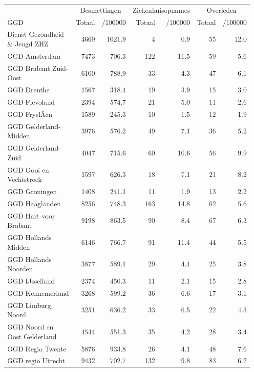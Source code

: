 \documentclass[
  english,
  man,floatsintext]{apa6}
\begin{document}
\begin{table}[H]
\centering\begingroup\fontsize{10}{12}\selectfont

\begin{threeparttable}
\begin{tabular}{lrrrrrr}
\toprule
\multicolumn{1}{c}{ } & \multicolumn{2}{c}{Besmettingen} & \multicolumn{2}{c}{Ziekenhuisopnames} & \multicolumn{2}{c}{Overleden} \\
\cmidrule(l{3pt}r{3pt}){2-3} \cmidrule(l{3pt}r{3pt}){4-5} \cmidrule(l{3pt}r{3pt}){6-7}
GGD & Totaal & /100000 & Totaal & /100000 & Totaal & /100000\\
\midrule
Dienst Gezondheid \& Jeugd ZHZ & 4669 & 1021.9 & 4 & 0.9 & 55 & 12.0\\
GGD Amsterdam & 7473 & 706.3 & 122 & 11.5 & 59 & 5.6\\
GGD Brabant Zuid-Oost & 6100 & 788.9 & 33 & 4.3 & 47 & 6.1\\
GGD Drenthe & 1567 & 318.4 & 19 & 3.9 & 15 & 3.0\\
GGD Flevoland & 2394 & 574.7 & 21 & 5.0 & 11 & 2.6\\
GGD FryslÃ¢n & 1589 & 245.3 & 10 & 1.5 & 12 & 1.9\\
GGD Gelderland-Midden & 3976 & 576.2 & 49 & 7.1 & 36 & 5.2\\
GGD Gelderland-Zuid & 4047 & 715.6 & 60 & 10.6 & 56 & 9.9\\
GGD Gooi en Vechtstreek & 1597 & 626.3 & 18 & 7.1 & 21 & 8.2\\
GGD Groningen & 1408 & 241.1 & 11 & 1.9 & 13 & 2.2\\
GGD Haaglanden & 8256 & 748.3 & 163 & 14.8 & 62 & 5.6\\
GGD Hart voor Brabant & 9198 & 863.5 & 90 & 8.4 & 67 & 6.3\\
GGD Hollands Midden & 6146 & 766.7 & 91 & 11.4 & 44 & 5.5\\
GGD Hollands Noorden & 3877 & 589.1 & 29 & 4.4 & 25 & 3.8\\
GGD IJsselland & 2374 & 450.3 & 11 & 2.1 & 15 & 2.8\\
GGD Kennemerland & 3268 & 599.2 & 36 & 6.6 & 17 & 3.1\\
GGD Limburg Noord & 3251 & 636.2 & 33 & 6.5 & 22 & 4.3\\
GGD Noord en Oost Gelderland & 4544 & 551.3 & 35 & 4.2 & 28 & 3.4\\
GGD Regio Twente & 5876 & 933.8 & 26 & 4.1 & 48 & 7.6\\
GGD regio Utrecht & 9432 & 702.7 & 132 & 9.8 & 83 & 6.2\\

\end{tabular}
\end{threeparttable}
\end{table}
\end{document}
